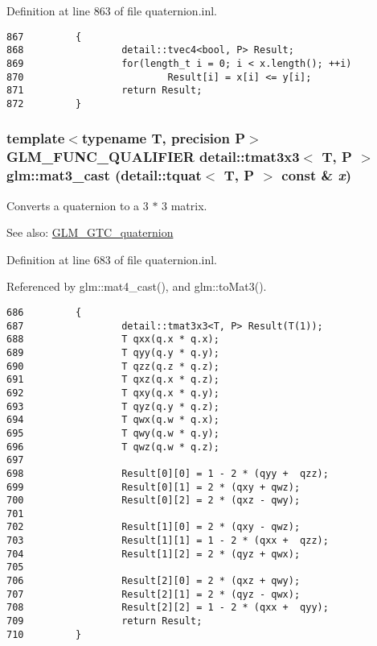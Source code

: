 Definition at line 863 of file quaternion.inl.

\begin{Code}\begin{verbatim}867         {
868                 detail::tvec4<bool, P> Result;
869                 for(length_t i = 0; i < x.length(); ++i)
870                         Result[i] = x[i] <= y[i];
871                 return Result;
872         }
\end{verbatim}
\end{Code}


\hypertarget{group__gtc__quaternion_gbbfeeb474bc34d9c73cfdc8af78cfb8b}{
\subsubsection[mat3\_\-cast]{\setlength{\rightskip}{0pt plus 5cm}template$<$typename T, precision P$>$ GLM\_\-FUNC\_\-QUALIFIER detail::tmat3x3$<$ T, P $>$ glm::mat3\_\-cast (detail::tquat$<$ T, P $>$ const \& {\em x})}}
\label{group__gtc__quaternion_gbbfeeb474bc34d9c73cfdc8af78cfb8b}


Converts a quaternion to a 3 $\ast$ 3 matrix.

\begin{Desc}
\item[See also:]\hyperlink{group__gtc__quaternion}{GLM\_\-GTC\_\-quaternion} \end{Desc}


Definition at line 683 of file quaternion.inl.

Referenced by glm::mat4\_\-cast(), and glm::toMat3().

\begin{Code}\begin{verbatim}686         {
687                 detail::tmat3x3<T, P> Result(T(1));
688                 T qxx(q.x * q.x);
689                 T qyy(q.y * q.y);
690                 T qzz(q.z * q.z);
691                 T qxz(q.x * q.z);
692                 T qxy(q.x * q.y);
693                 T qyz(q.y * q.z);
694                 T qwx(q.w * q.x);
695                 T qwy(q.w * q.y);
696                 T qwz(q.w * q.z);
697 
698                 Result[0][0] = 1 - 2 * (qyy +  qzz);
699                 Result[0][1] = 2 * (qxy + qwz);
700                 Result[0][2] = 2 * (qxz - qwy);
701 
702                 Result[1][0] = 2 * (qxy - qwz);
703                 Result[1][1] = 1 - 2 * (qxx +  qzz);
704                 Result[1][2] = 2 * (qyz + qwx);
705 
706                 Result[2][0] = 2 * (qxz + qwy);
707                 Result[2][1] = 2 * (qyz - qwx);
708                 Result[2][2] = 1 - 2 * (qxx +  qyy);
709                 return Result;
710         }
\end{verbatim}
\end{Code}




